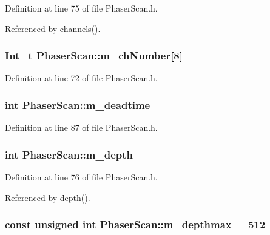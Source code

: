 Definition at line 75 of file PhaserScan.h.

Referenced by channels().\hypertarget{classPhaserScan_a6fd741cbc6a81d527e25aa9e8c7f27e0}{
\subsubsection[{m\_\-chNumber}]{\setlength{\rightskip}{0pt plus 5cm}Int\_\-t {\bf PhaserScan::m\_\-chNumber}\mbox{[}8\mbox{]}}}
\label{classPhaserScan_a6fd741cbc6a81d527e25aa9e8c7f27e0}


Definition at line 72 of file PhaserScan.h.\hypertarget{classPhaserScan_aef87ca678cea59093899a7cd138a9e25}{
\subsubsection[{m\_\-deadtime}]{\setlength{\rightskip}{0pt plus 5cm}int {\bf PhaserScan::m\_\-deadtime}}}
\label{classPhaserScan_aef87ca678cea59093899a7cd138a9e25}


Definition at line 87 of file PhaserScan.h.\hypertarget{classPhaserScan_a445487a8eea9b6d484ae8615cb1bd52d}{
\subsubsection[{m\_\-depth}]{\setlength{\rightskip}{0pt plus 5cm}int {\bf PhaserScan::m\_\-depth}}}
\label{classPhaserScan_a445487a8eea9b6d484ae8615cb1bd52d}


Definition at line 76 of file PhaserScan.h.

Referenced by depth().\hypertarget{classPhaserScan_a3c5a969d3fef57564d2632b256bf857e}{
\subsubsection[{m\_\-depthmax}]{\setlength{\rightskip}{0pt plus 5cm}const unsigned int {\bf PhaserScan::m\_\-depthmax} = 512}}
\label{classPhaserScan_a3c5a969d3fef57564d2632b256bf857e}


